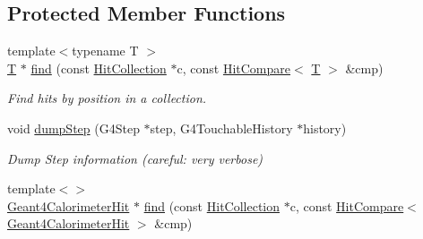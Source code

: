 \subsection*{Protected Member Functions}
\begin{DoxyCompactItemize}
\item 
{\footnotesize template$<$typename T $>$ }\\\hyperlink{class_t}{T} $\ast$ \hyperlink{class_d_d4hep_1_1_simulation_1_1_geant4_sensitive_detector_a6c8e0611bafa6aab392e12ae55d14ad0}{find} (const \hyperlink{class_d_d4hep_1_1_simulation_1_1_geant4_sensitive_detector_a4865cf9c96edfef8cd41e309a4cd6211}{Hit\+Collection} $\ast$c, const \hyperlink{class_d_d4hep_1_1_simulation_1_1_hit_compare}{Hit\+Compare}$<$ \hyperlink{class_t}{T} $>$ \&cmp)
\begin{DoxyCompactList}\small\item\em Find hits by position in a collection. \end{DoxyCompactList}\item 
void \hyperlink{class_d_d4hep_1_1_simulation_1_1_geant4_sensitive_detector_aa5dfd46956ecfddd3815e12be4436430}{dump\+Step} (G4\+Step $\ast$step, G4\+Touchable\+History $\ast$history)
\begin{DoxyCompactList}\small\item\em Dump Step information (careful\+: very verbose) \end{DoxyCompactList}\item 
{\footnotesize template$<$$>$ }\\\hyperlink{class_d_d4hep_1_1_simulation_1_1_geant4_calorimeter_hit}{Geant4\+Calorimeter\+Hit} $\ast$ \hyperlink{class_d_d4hep_1_1_simulation_1_1_geant4_sensitive_detector_a8908101354409b3b4eb073222fd7bbee}{find} (const \hyperlink{class_d_d4hep_1_1_simulation_1_1_geant4_sensitive_detector_a4865cf9c96edfef8cd41e309a4cd6211}{Hit\+Collection} $\ast$c, const \hyperlink{class_d_d4hep_1_1_simulation_1_1_hit_compare}{Hit\+Compare}$<$ \hyperlink{class_d_d4hep_1_1_simulation_1_1_geant4_calorimeter_hit}{Geant4\+Calorimeter\+Hit} $>$ \&cmp)
\end{DoxyCompactItemize}
